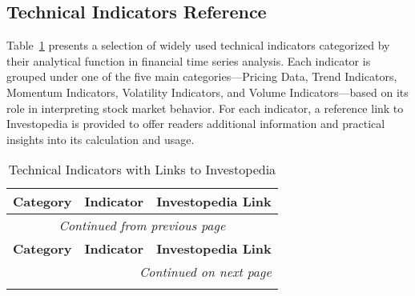 \begin{landscape}

\clearpage
\subsection{Technical Indicators Reference}
\label{app:techind}

Table~\ref{tab:docind} presents a selection of widely used technical 
indicators categorized by their analytical function in financial time 
series analysis. Each indicator is grouped under one of the five main 
categories—Pricing Data, Trend Indicators, Momentum Indicators, 
Volatility Indicators, and Volume Indicators—based on its role in 
interpreting stock market behavior. For each indicator, a reference link
to Investopedia is provided to offer readers additional information and 
practical insights into its calculation and usage.

\begin{longtable}{lp{5cm}p{10cm}}
\caption{Technical Indicators with Links to Investopedia} \label{tab:docind} \\
\hline
\textbf{Category} & \textbf{Indicator} & \textbf{Investopedia Link} \\
\hline
\endfirsthead

\multicolumn{3}{c}{\textit{Continued from previous page}} \\
\hline
\textbf{Category} & \textbf{Indicator} & \textbf{Investopedia Link} \\
\hline
\endhead

\hline \multicolumn{3}{r}{\textit{Continued on next page}} \\
\endfoot

\hline
\endlastfoot


\end{longtable}
\end{landscape}
